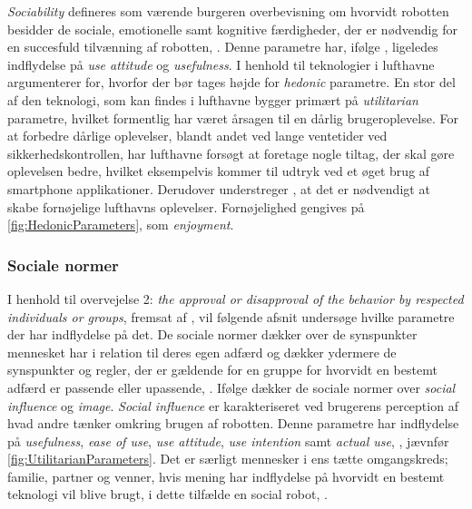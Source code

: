 \textit{Sociability} defineres som værende burgeren overbevisning om hvorvidt robotten besidder de sociale, emotionelle samt kognitive færdigheder, der er nødvendig for en succesfuld tilvænning af robotten, \parencite[s. 1478]{PDF:ExploringInfluencingVariable}. Denne parametre har, ifølge \textcite[s. 1478]{PDF:ExploringInfluencingVariable}, ligeledes indflydelse på \textit{use attitude} og \textit{usefulness}.\blankline
%
I henhold til teknologier i lufthavne argumenterer \textcite[s. 352]{PDF:TheImpactOfTraveler} for, hvorfor der bør tages højde for \textit{hedonic} parametre. En stor del af den teknologi, som kan findes i lufthavne bygger primært på \textit{utilitarian} parametre, hvilket formentlig har været årsagen til en dårlig brugeroplevelse. For at forbedre dårlige oplevelser, blandt andet ved lange ventetider ved sikkerhedskontrollen, har lufthavne forsøgt at foretage nogle tiltag, der skal gøre oplevelsen bedre, hvilket eksempelvis kommer til udtryk ved et øget brug af smartphone applikationer. Derudover understreger \textcite[s. 352]{PDF:TheImpactOfTraveler}, at det er nødvendigt at skabe fornøjelige lufthavns oplevelser. Fornøjelighed gengives på \autoref{fig:HedonicParameters}, som \textit{enjoyment}.
%

\subsubsection*{Sociale normer}
\label{InteraktionSocialeRobotterParametreSocialeNormer}
% 
I henhold til overvejelse 2: \textit{the approval or disapproval of the behavior by respected individuals or groups}, fremsat af \textcite[s. 1477]{PDF:SharingALifeHarvey}, vil følgende afsnit undersøge hvilke parametre der har indflydelse på det.\blankline
%
De sociale normer dækker over de synspunkter mennesket har i relation til deres egen adfærd og dækker ydermere de synspunkter og regler, der er gældende for en gruppe for hvorvidt en bestemt adfærd er passende eller upassende, \parencite[s. 1478]{PDF:ExploringInfluencingVariable}. Ifølge \textcite[s. 1478]{PDF:ExploringInfluencingVariable} dækker de sociale normer over \textit{social influence} og \textit{image}. \textit{Social influence} er karakteriseret ved brugerens perception af hvad andre tænker omkring brugen af robotten. Denne parametre har indflydelse på \textit{usefulness}, \textit{ease of use}, \textit{use attitude}, \textit{use intention} samt \textit{actual use}, \parencite[s. 1478]{PDF:ExploringInfluencingVariable}, jævnfør \autoref{fig:UtilitarianParameters}. Det er særligt mennesker i ens tætte omgangskreds; familie, partner og venner, hvis mening har indflydelse på hvorvidt en bestemt teknologi vil blive brugt, i dette tilfælde en social robot, \parencite[s. 1478]{PDF:ExploringInfluencingVariable}. 

